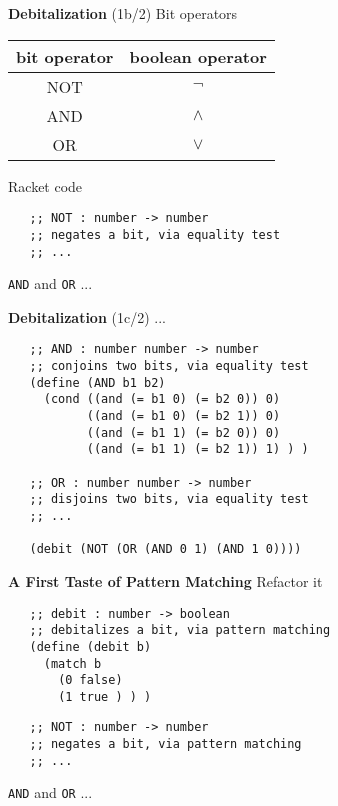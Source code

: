 \documentclass[12pt]{beamer}
\begin{document}
\begin{frame}[fragile]{{\bf Debitalization} (1b/2)}
 Bit operators
 \begin{table}
  \centering
  \begin{tabular}{|c|c|}
   \hline
   bit operator & boolean operator \\
   \hline
   NOT & $\neg$ \\
   \hline
   AND & $\wedge$ \\
   \hline
   OR  & $\vee$  \\
   \hline
  \end{tabular}
 \end{table}

 \pause
 
 Racket code
 {\footnotesize
  \begin{verbatim}
   ;; NOT : number -> number
   ;; negates a bit, via equality test
   ;; ...
  \end{verbatim}
 }

 \pause

 \verb|AND| and \verb|OR| ...
\end{frame}

\begin{frame}[fragile]{{\bf Debitalization} (1c/2)}
 ...

 \pause

 {\footnotesize
  \begin{verbatim}
   ;; AND : number number -> number
   ;; conjoins two bits, via equality test
   (define (AND b1 b2)
     (cond ((and (= b1 0) (= b2 0)) 0)
           ((and (= b1 0) (= b2 1)) 0)
           ((and (= b1 1) (= b2 0)) 0)
           ((and (= b1 1) (= b2 1)) 1) ) )

   ;; OR : number number -> number
   ;; disjoins two bits, via equality test
   ;; ...

   (debit (NOT (OR (AND 0 1) (AND 1 0))))
  \end{verbatim}
 }
\end{frame}

\begin{frame}[fragile]{\bf A First Taste of Pattern Matching}
 Refactor it
 {\footnotesize
  \begin{verbatim}
   ;; debit : number -> boolean
   ;; debitalizes a bit, via pattern matching
   (define (debit b)
     (match b
       (0 false)
       (1 true ) ) )
  \end{verbatim}
 }

 \pause

 {\footnotesize
  \begin{verbatim}
   ;; NOT : number -> number
   ;; negates a bit, via pattern matching
   ;; ...
  \end{verbatim}
 }

 \pause

 \verb|AND| and \verb|OR| ...
\end{frame}
\end{document}
